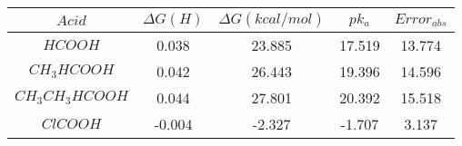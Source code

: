 \begin{tabular}{|c|c|c|c|c|}
    \hline
    $Acid$          & $\Delta G (H)$ & $\Delta G (kcal/mol)$ & $pk_a$ & $Error_{abs}$ \\ \hline
    $HCOOH$         & 0.038          & 23.885                & 17.519 & 13.774        \\ \hline
    $CH_3HCOOH$     & 0.042          & 26.443                & 19.396 & 14.596        \\ \hline
    $CH_3CH_3HCOOH$ & 0.044          & 27.801                & 20.392 & 15.518        \\ \hline
    $ClCOOH$        & -0.004         & -2.327                & -1.707 & 3.137         \\ \hline
\end{tabular}